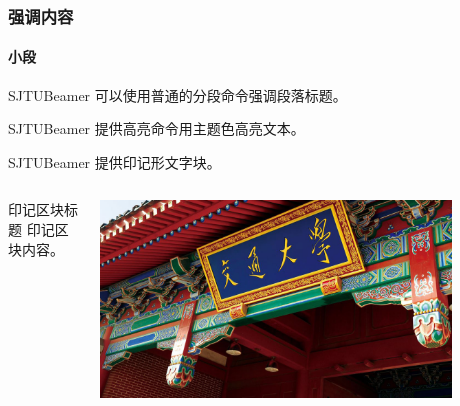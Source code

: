 \documentclass[
    aspectratio=169,  %
]{ctexbeamer}
\begin{document}
\begin{frame}
  \frametitle{强调内容}

  \paragraph{小段} SJTUBeamer 可以使用普通的分段命令强调段落标题。

   SJTUBeamer 提供高亮命令用主题色高亮文本。

   SJTUBeamer 提供印记形文字块。

  \stamphrule

  \begin{columns}
    \begin{column}{0.4\textwidth}
      \begin{stampblock}{印记区块标题}
        印记区块内容。
      \end{stampblock}
    \end{column}
    \begin{column}{0.3\textwidth}
      \begin{stampbox}
        \includegraphics[width=0.9\textwidth]{vi/sjtuphoto.jpg}
      \end{stampbox}
    \end{column}
    \begin{column}{0.3\textwidth}
    \end{column}
  \end{columns}

\end{frame}
\end{document}
